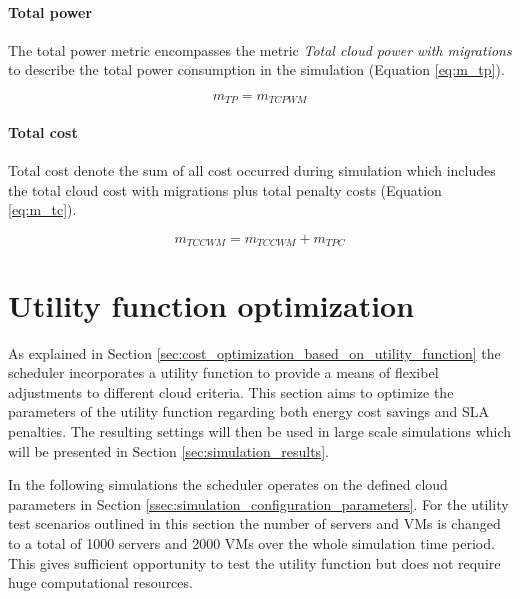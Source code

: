 \paragraph{Total power}

The total power metric encompasses the metric \textit{Total cloud power with migrations} to describe the total power consumption in the simulation (Equation \ref{eq:m_tp}). 

\begin{equation}
	m_{TP} = m_{TCPWM}
\label{eq:m_tp}
\end{equation}

\paragraph{Total cost}

Total cost denote the sum of all cost occurred during simulation which includes the total cloud cost with migrations plus total penalty costs (Equation \ref{eq:m_tc}). 

\begin{equation}
	m_{TCCWM} = m_{TCCWM} + m_{TPC}
\label{eq:m_tc}
\end{equation}









\section{Utility function optimization}

As explained in Section \ref{sec:cost_optimization_based_on_utility_function} the scheduler incorporates a utility function to provide a means of flexibel adjustments to different cloud criteria. This section aims to optimize the parameters of the utility function regarding both energy cost savings and SLA penalties. The resulting settings will then be used in large scale simulations which will be presented in Section \ref{sec:simulation_results}. 

In the following simulations the scheduler operates on the defined cloud parameters in Section \ref{ssec:simulation_configuration_parameters}. 
For the utility test scenarios outlined in this section the number of servers and VMs is changed to a total of 1000 servers and 2000 VMs over the whole simulation time period. This gives sufficient opportunity to test the utility function but does not require huge computational resources. 

